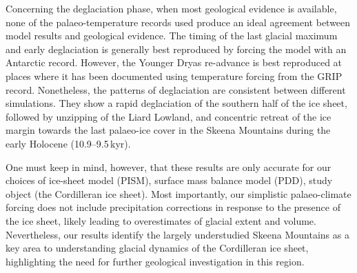 \documentclass[tc, ms]{copernicus}
\begin{document}
Concerning the deglaciation phase, when most geological evidence is available,
none of the palaeo-temperature records used produce an ideal agreement between
model results and geological evidence. The
timing of the last glacial maximum and early deglaciation is generally best
reproduced by forcing the model with an Antarctic
record. However, the Younger Dryas re-advance is best reproduced at places
where it has been documented using temperature forcing from the GRIP record.
Nonetheless, the patterns of deglaciation are consistent between different
simulations. They show a rapid deglaciation of the southern half of the ice
sheet, followed by unzipping of the Liard Lowland, and concentric retreat of
the ice margin towards the last palaeo-ice cover in the Skeena Mountains
during the early Holocene (10.9--9.5\,\unit{kyr}).

One must keep in mind, however, that these results are only accurate for our
choices of ice-sheet model (PISM), surface mass balance model (PDD), study
object (the Cordilleran ice sheet). Most importantly, our simplistic
palaeo-climate forcing does not include precipitation corrections in response
to the presence of the ice sheet, likely leading to overestimates of glacial
extent and volume. Nevertheless, our results identify the largely understudied
Skeena Mountains as a key area to understanding glacial dynamics of the
Cordilleran ice sheet, highlighting the need for further geological
investigation in this region.


%
\newpage

\end{document}
